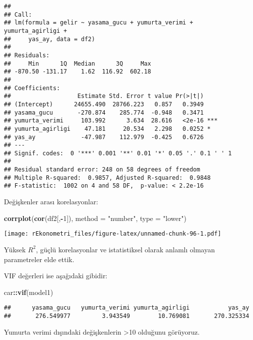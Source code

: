\documentclass[
]{book}
\newenvironment{Shaded}{\begin{snugshade}}{\end{snugshade}}
\newcommand{\DataTypeTok}[1]{\textcolor[rgb]{0.13,0.29,0.53}{#1}}
\newcommand{\DecValTok}[1]{\textcolor[rgb]{0.00,0.00,0.81}{#1}}
\newcommand{\KeywordTok}[1]{\textcolor[rgb]{0.13,0.29,0.53}{\textbf{#1}}}
\newcommand{\NormalTok}[1]{#1}
\newcommand{\OperatorTok}[1]{\textcolor[rgb]{0.81,0.36,0.00}{\textbf{#1}}}
\newcommand{\StringTok}[1]{\textcolor[rgb]{0.31,0.60,0.02}{#1}}
\begin{document}
\begin{verbatim}
## 
## Call:
## lm(formula = gelir ~ yasama_gucu + yumurta_verimi + yumurta_agirligi + 
##     yas_ay, data = df2)
## 
## Residuals:
##     Min      1Q  Median      3Q     Max 
## -870.50 -131.17    1.62  116.92  602.18 
## 
## Coefficients:
##                   Estimate Std. Error t value Pr(>|t|)    
## (Intercept)      24655.490  28766.223   0.857   0.3949    
## yasama_gucu       -270.874    285.774  -0.948   0.3471    
## yumurta_verimi     103.992      3.634  28.616   <2e-16 ***
## yumurta_agirligi    47.181     20.534   2.298   0.0252 *  
## yas_ay             -47.987    112.979  -0.425   0.6726    
## ---
## Signif. codes:  0 '***' 0.001 '**' 0.01 '*' 0.05 '.' 0.1 ' ' 1
## 
## Residual standard error: 248 on 58 degrees of freedom
## Multiple R-squared:  0.9857, Adjusted R-squared:  0.9848 
## F-statistic:  1002 on 4 and 58 DF,  p-value: < 2.2e-16
\end{verbatim}

Değişkenler arası korelasyonlar:

\begin{Shaded}
\begin{Highlighting}[]
\KeywordTok{corrplot}\NormalTok{(}\KeywordTok{cor}\NormalTok{(df2[,}\OperatorTok{-}\DecValTok{1}\NormalTok{]), }\DataTypeTok{method =} \StringTok{"number"}\NormalTok{, }\DataTypeTok{type =} \StringTok{"lower"}\NormalTok{)}
\end{Highlighting}
\end{Shaded}

\texttt{[image: rEkonometri\_files/figure-latex/unnamed-chunk-96-1.pdf]}

Yüksek \(R^2\), güçlü korelasyonlar ve istatistiksel olarak anlamlı olmayan parametreler elde ettik.

VIF değerleri ise aşağıdaki gibidir:

\begin{Shaded}
\begin{Highlighting}[]
\NormalTok{car}\OperatorTok{::}\KeywordTok{vif}\NormalTok{(model1)}
\end{Highlighting}
\end{Shaded}

\begin{verbatim}
##      yasama_gucu   yumurta_verimi yumurta_agirligi           yas_ay 
##       276.549977         3.943549        10.769081       270.325334
\end{verbatim}

Yumurta verimi dışındaki değişkenlerin \textgreater10 olduğunu görüyoruz.
\end{document}
